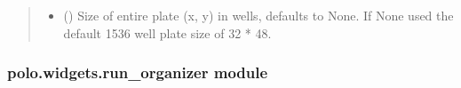 \documentclass[letterpaper,10pt,english]{sphinxmanual}
\begin{document}
\begin{fulllineitems}
\begin{fulllineitems}
\begin{quote}
\begin{description}
\begin{itemize}
\item {} 
 (\sphinxstyleliteralemphasis{\sphinxupquote{, }}) \textendash{} Size of entire plate (x, y) in wells, defaults to None.
If None used the default 1536 well plate size of
32 * 48.

\end{itemize}

\end{description}\end{quote}

\end{fulllineitems}


\end{fulllineitems}



\subsubsection{polo.widgets.run\_organizer module}
\label{\detokenize{polo.widgets:module-polo.widgets.run_organizer}}\label{\detokenize{polo.widgets:polo-widgets-run-organizer-module}}
\end{document}
